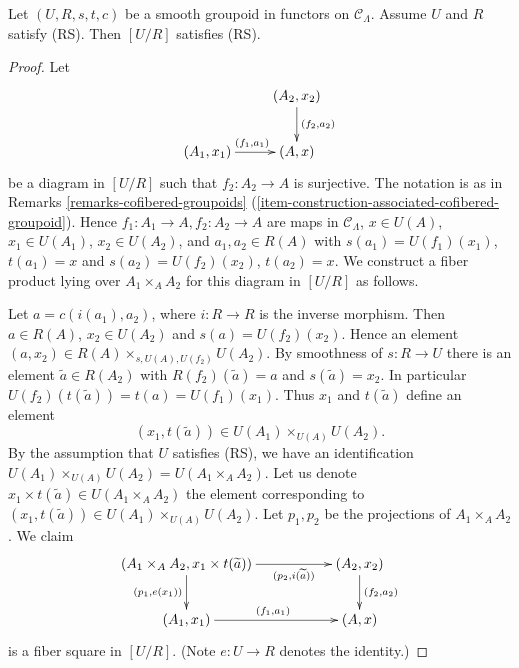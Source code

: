 \begin{lemma}
\label{lemma-smooth-RS-groupoid-in-functors-quotient}
Let $(U, R, s, t, c)$ be a smooth groupoid in functors on $\mathcal{C}_\Lambda$.
Assume $U$ and $R$ satisfy (RS). Then $[U/R]$ satisfies (RS).
\end{lemma}

\begin{proof}
Let
$$
\xymatrix{
                           &     (A_2, x_2) \ar[d]^{(f_2, a_2)} \\
(A_1, x_1) \ar[r]^{(f_1, a_1)} &     (A, x)
}
$$
be a diagram in $[U/R]$ such that $f_2: A_2 \to A$ is surjective. The
notation is as in
Remarks \ref{remarks-cofibered-groupoids}
(\ref{item-construction-associated-cofibered-groupoid}).
Hence $f_1: A_1 \to A, f_2: A_2 \to A$ are maps in
$\mathcal{C}_\Lambda$, $x \in U(A)$, $x_1 \in U(A_1)$, $x_2 \in U(A_2)$,
and $a_1, a_2 \in R(A)$ with $s(a_1) = U(f_1)(x_1)$,
$t(a_1) = x$ and $s(a_2) = U(f_2)(x_2)$, $t(a_2) = x$.
We construct a fiber product lying over $A_1 \times_A A_2$
for this diagram in $[U/R]$ as follows.

\medskip\noindent
Let $a = c(i(a_1), a_2)$, where $i: R \to R$ is the inverse morphism.
Then $a \in R(A)$, $x_2 \in U(A_2)$ and $s(a) = U(f_2)(x_2)$.
Hence an element $(a, x_2) \in R(A) \times_{s, U(A), U(f_2)} U(A_2)$.
By smoothness of $s : R \to U$ there is an element
$\widetilde{a} \in R(A_2)$ with $R(f_2)(\widetilde{a}) = a$ and
$s(\widetilde{a}) = x_2$. In particular
$U(f_2)(t(\widetilde{a})) = t(a) = U(f_1)(x_1)$. Thus $x_1$ and
$t(\widetilde{a})$ define an element
$$
(x_1, t(\widetilde{a})) \in U(A_1) \times_{U(A)} U(A_2).
$$
By the assumption that $U$ satisfies (RS), we have an identification
$U(A_1) \times_{U(A)} U(A_2) = U(A_1 \times_A A_2)$. Let us denote
$x_1 \times t(\widetilde{a}) \in U(A_1 \times_A A_2)$ the element
corresponding to $(x_1, t(\widetilde{a})) \in U(A_1) \times_{U(A)} U(A_2)$.
Let $p_1, p_2$ be the projections of $A_1 \times_A A_2$.  We claim
$$
\xymatrix{
(A_1 \times_A A_2, x_1 \times t(\widetilde{a})) \ar[d]_{(p_1, e(x_1))}
\ar[rr]_-{(p_2, i(\widetilde{a}))} & & (A_2, x_2) \ar[d]^{(f_2, a_2)} \\
(A_1, x_1) \ar[rr]^{(f_1, a_1)} & & (A, x)
}
$$
is a fiber square in $[U/R]$. (Note $e: U \to R$ denotes the identity.)


\end{proof}
